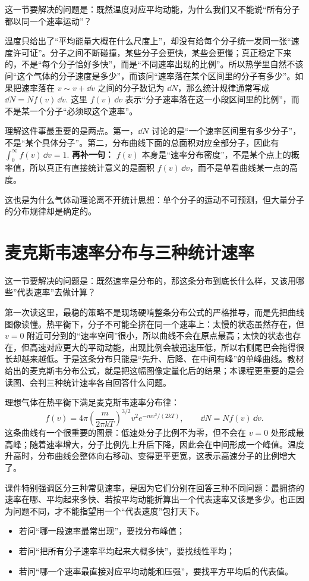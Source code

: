 \documentclass[lang=cn,11pt]{elegantbook}
\newcommand{\bridge}[1]{\begin{note}#1\end{note}}
\begin{document}
这一节要解决的问题是：既然温度对应平均动能，为什么我们又不能说“所有分子都以同一个速率运动”？

温度只给出了“平均能量大概在什么尺度上”，却没有给每个分子统一发同一张“速度许可证”。分子之间不断碰撞，某些分子会更快，某些会更慢；真正稳定下来的，不是“每个分子恰好多快”，而是“不同速率出现的比例”。所以热学里自然不该问“这个气体的分子速度是多少”，而该问“速率落在某个区间里的分子有多少”。如果把速率落在 \(v\sim v+\dd v\) 之间的分子数记为 \(\dd N\)，那么统计规律通常写成
 \(\dd N=Nf(v)\,\dd v.\) 
这里 \(f(v)\,\dd v\) 表示“分子速率落在这一小段区间里的比例”，而不是某一个分子“必须取这个速率”。

\begin{note}
理解这件事最重要的是两点。第一，\(\dd N\) 讨论的是“一个速率区间里有多少分子”，不是“某个具体分子”。第二，分布曲线下面的总面积对应全部分子，因此有
 \(\int_0^{\infty} f(v)\,\dd v=1.\) 
\textbf{再补一句：} \(f(v)\) 本身是“速率分布密度”，不是某个点上的概率值，所以真正有直接统计意义的是面积 \(f(v)\,\dd v\)，而不是单看曲线某一点的高度。
\end{note}

这也是为什么气体动理论离不开统计思想：单个分子的运动不可预测，但大量分子的分布规律却是确定的。

\section{麦克斯韦速率分布与三种统计速率}

这一节要解决的问题是：既然速率是分布的，那这条分布到底长什么样，又该用哪些”代表速率”去做计算？

\bridge{第一次读这里，最稳的策略不是现场硬啃整条分布公式的严格推导，而是先把曲线图像读懂。热平衡下，分子不可能全挤在同一个速率上：太慢的状态虽然存在，但 \(v=0\) 附近可分到的“速率空间”很小，所以曲线不会在原点最高；太快的状态也存在，但高速对应更大的平动动能，出现比例会被迅速压低，所以右侧尾巴会拖得很长却越来越低。于是这条分布只能是“先升、后降、在中间有峰”的单峰曲线。教材给出的麦克斯韦分布公式，就是把这幅图像定量化后的结果；本课程更重要的是会读图、会判三种统计速率各自回答什么问题。}

理想气体在热平衡下满足麦克斯韦速率分布律：
\[
f(v)=4\pi\left(\frac{m}{2\pi kT}\right)^{3/2}v^2 e^{-mv^2/(2kT)},
\qquad \dd N=Nf(v)\,\dd v.
\]
这条曲线有一个很重要的图景：低速处分子比例不为零，但不会在 \(v=0\) 处形成最高峰；随着速率增大，分子比例先上升后下降，因此会在中间形成一个峰值。温度升高时，分布曲线会整体向右移动、变得更平更宽，这表示高速分子的比例增大了。

课件特别强调区分三种常见速率，是因为它们分别在回答三种不同问题：最拥挤的速率在哪、平均起来多快、若按平均动能折算出一个代表速率又该是多少。也正因为问题不同，才不能指望用一个“代表速度”包打天下。
\begin{itemize}
 \item 若问“哪一段速率最常出现”，要找分布峰值；
 \item 若问“把所有分子速率平均起来大概多快”，要找线性平均；
 \item 若问“哪一个速率最直接对应平均动能和压强”，要找平方平均后的代表值。
\end{itemize}
\end{document}

